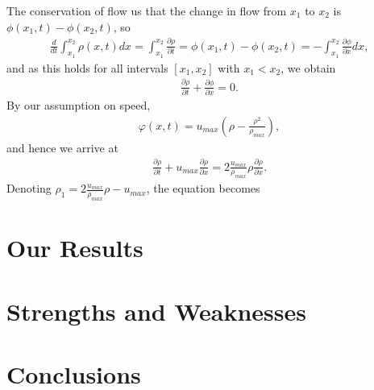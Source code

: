 \documentclass[12pt]{article}
\begin{document}
The conservation of flow us that the change in flow from $x_1$ to $x_2$ is $\phi(x_1,t)-\phi(x_2,t)$, so
\begin{align*}
\frac{d}{dt}\int_{x_1}^{x_2} \rho(x,t)dx=\int_{x_1}^{x_2}\frac{\partial \rho}{\partial t }=\phi(x_1,t)-\phi(x_2,t)=-\int_{x_1}^{x_2}\frac{\partial \phi}{\partial x}dx,
\end{align*}
and as this holds for all intervals $[x_1,x_2]$ with $x_1<x_2$, we obtain
\begin{align*}
\frac{\partial \rho}{\partial t}+\frac{\partial \phi}{\partial x}=0.
\end{align*}
By our assumption on speed,
\begin{align*}
\varphi(x,t)=u_{max}\left(\rho-\frac{\rho^2}{\rho_{max}}\right),
\end{align*}
and hence we arrive at
\begin{align*}
\frac{\partial \rho}{\partial t}+u_{max}\frac{\partial \rho}{\partial x}=2\frac{u_{max}}{\rho_{max}}\rho \frac{\partial \rho}{\partial x}.
\end{align*}
Denoting $\rho_1=2\frac{u_{max}}{\rho_{max}}\rho-u_{max}$, the equation becomes

\newpage

\section{Our Results}


\newpage

\section{Strengths and Weaknesses}




\newpage
\section{Conclusions}























\end{document}
